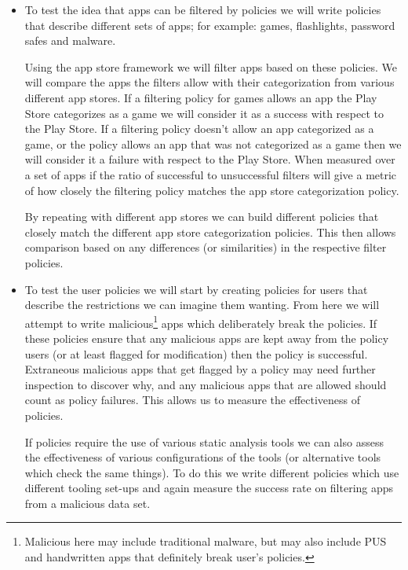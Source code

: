 \documentclass[a4paper,sfsidenotes]{%
  article%
}
\begin{document}
\begin{itemize}
\begin{description}
  \end{description}

  \item To test the idea that apps can be filtered by policies we will write
    policies that describe different sets of apps; for example: games,
    flashlights, password safes and malware.  

    Using the app store framework we will filter apps based on these policies.
    We will compare the apps the filters allow with their categorization from
    various different app stores.  If a filtering policy for games allows an app
    the Play Store categorizes as a game we will consider it as a success with
    respect to the Play Store.  If a filtering policy doesn't allow an app
    categorized as a game, or the policy allows an app that was not categorized
    as a game then we will consider it a failure with respect to the Play Store.
    When measured over a set of apps if the ratio of successful to unsuccessful
    filters will give a metric of how closely the filtering policy matches the
    app store categorization policy.

    By repeating with different app stores we can build different policies that
    closely match the different app store categorization policies.  This then
    allows comparison based on any differences (or similarities) in the
    respective filter policies. 

  \item To test the user policies we will start by creating policies for users
    that describe the restrictions we can imagine them wanting.  From here we
    will attempt to write malicious\footnote{Malicious here may include
      traditional malware, but may also include \ac{PUS} and handwritten apps
    that definitely break user's policies.} apps which deliberately break the
    policies.   If these policies ensure that any malicious apps are kept away
    from the policy users (or at least flagged for modification) then the policy
    is successful.  Extraneous malicious apps that get flagged by a policy may
    need further inspection to discover why, and any malicious apps that are
    allowed should count as policy failures.  This allows us to measure the
    effectiveness of policies.

    If policies require the use of various static analysis tools we can also
    assess the effectiveness of various configurations of the tools (or
    alternative tools which check the same things).  To do this we write
    different policies which use different tooling set-ups and again measure the
    success rate on filtering apps from a malicious data set.


\end{itemize}
\end{document}
